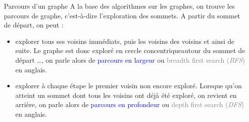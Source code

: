 \documentclass[10pt,french]{beamer}
\begin{document}
\begin{frame}[fragile]{\Ctitle}{\stitle}
	\begin{block}{Parcours d'un graphe}
		A la base des algorithmes sur les graphes, on trouve les parcours de graphe, c'est-à-dire l'exploration des sommets. A partir du sommet de départ, on peut :
		\begin{itemize}
			\item<1-> explorer tous ses voisins immédiats, puis les voisins des voisins et ainsi de suite. Le graphe est donc exploré en \og cercle concentrique\fg autour du sommet de départ  \dots, on parle alors de  \textcolor{blue}{parcours en largeur} ou \textcolor{gray}{breadth first search (\textit{BFS})} en anglais.
			\item<2-> explorer à chaque étape le premier voisin non encore exploré. Lorsque qu'on atteint un sommet dont tous les voisins ont déjà été exploré, on revient en arrière, on parle alors de  \textcolor{blue}{parcours en profondeur} ou \textcolor{gray}{depth first search (\textit{DFS})} en anglais.
		\end{itemize}
	\end{block}
\end{frame}
\end{document}
